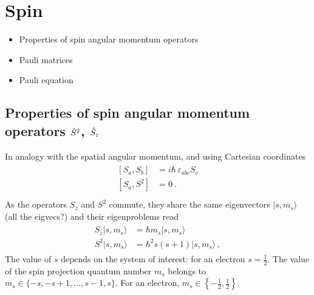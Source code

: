 \documentclass[letterpaper,10pt,english]{jupyterBook}
\begin{document}
\sphinxstepscope


\section{Spin}
\label{\detokenize{ch/quantum-mechanics/angular-momentum/angular-momentum-spin:spin}}\label{\detokenize{ch/quantum-mechanics/angular-momentum/angular-momentum-spin:quantum-mechanics-angular-momentum-spin}}\label{\detokenize{ch/quantum-mechanics/angular-momentum/angular-momentum-spin::doc}}\begin{itemize}
\item {} 
\sphinxAtStartPar
Properties of spin angular momentum operators

\item {} 
\sphinxAtStartPar
Pauli matrices

\item {} 
\sphinxAtStartPar
Pauli equation

\end{itemize}


\subsection{Properties of spin angular momentum operators \protect\(\hat{S}^2\protect\), \protect\(\hat{S}_z\protect\)}
\label{\detokenize{ch/quantum-mechanics/angular-momentum/angular-momentum-spin:properties-of-spin-angular-momentum-operators-hat-s-2-hat-s-z}}\label{\detokenize{ch/quantum-mechanics/angular-momentum/angular-momentum-spin:quantum-mechanics-angular-momentum-spin-operator}}
\sphinxAtStartPar
In analogy with the spatial angular momentum, and using Cartesian coordinates
\begin{equation*}
\begin{split}\begin{aligned}
  \left[ S_a, S_b \right] & = i \hbar \, \varepsilon_{abc} S_c \\
  \left[ S_a, S^2 \right] & = 0 \ . \\
\end{aligned}\end{split}
\end{equation*}
\sphinxAtStartPar
As the operators \(S_z\) and \(S^2\) commute, they share the same eigenvectors \(| s, m_s \rangle\) (all the eigvecs?) and their eigenproblems read
\begin{equation*}
\begin{split}\begin{aligned}
  S_z | s, m_s \rangle & = \hbar m_s | s, m_s \rangle \\
  S^2 | s, m_s \rangle & = \hbar^2 s ( s + 1 ) | s, m_s \rangle \ , 
\end{aligned}\end{split}
\end{equation*}
\sphinxAtStartPar
The value of \(s\) depends on the system of interest: for an electron \(s = \frac{1}{2}\). The value of the spin projection quantum number \(m_s\) belongs to \(m_s \in \{ -s, -s+1, \dots, s-1, s \}\). For an electron, \(m_s \in \left\{ - \frac{1}{2}, \frac{1}{2} \right\}\).
\end{document}
